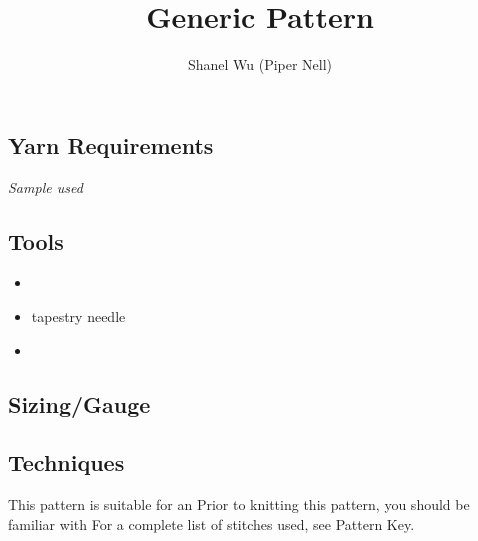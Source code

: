 \documentclass[12pt]{article}
\title{Generic Pattern} %
\author{Shanel Wu (Piper Nell)}
\begin{document}
\begin{titlingpage}


{\selectfont
\HUGE\textbf{\thetitle}
\hspace{2em} %
\normalsize\theauthor
}

\begin{multicols}{2}


\subsection*{Yarn Requirements}


\emph{Sample used}

\subsection*{Tools}

\begin{itemize}
\item %
\item tapestry needle
\item %
\end{itemize}

\subsection*{Sizing/Gauge}


\subsection*{Techniques}

This pattern is suitable for an %
Prior to knitting this pattern, you should be familiar with %
For a complete list of stitches used, see Pattern Key.


\vfill
\columnbreak


\end{multicols}
\end{titlingpage}
\end{document}
